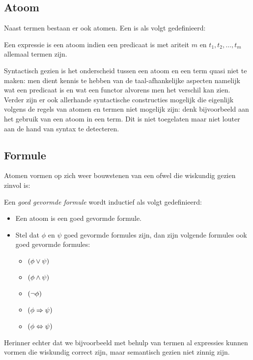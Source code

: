 \subsection{Atoom}
Naast termen bestaan er ook atomen. Een  is als volgt gedefinieerd:
\begin{definition}[Atoom]
Een expressie  is een atoom indien  een predicaat is met ariteit $m$ en $t_1,t_2,\ldots,t_m$ allemaal termen zijn.
\end{definition}
Syntactisch gezien is het onderscheid tussen een atoom en een term quasi niet te maken: men dient kennis te hebben van de taal-afhankelijke aspecten namelijk wat een predicaat is en wat een functor alvorens men het verschil kan zien. Verder zijn er ook allerhande syntactische constructies mogelijk die eigenlijk volgens de regels van atomen en termen niet mogelijk zijn: denk bijvoorbeeld aan het gebruik van een atoom in een term. Dit is niet toegelaten maar niet louter aan de hand van syntax te detecteren.
\subsection{Formule}
Atomen vormen op zich weer bouwstenen van een  ofwel  die wiskundig gezien zinvol is:
\begin{definition}
Een \emph{goed gevormde formule} wordt inductief als volgt gedefinieerd:
\begin{itemize}
 \item Een atoom is een goed gevormde formule.
 \item Stel dat $\phi$ en $\psi$ goed gevormde formules zijn, dan zijn volgende formules ook goed gevormde formules:
 \begin{multicols}{5}
  \begin{itemize}
   \item $\left( \phi\vee\psi \right)$
   \item $\left( \phi\wedge\psi \right)$
   \item $\left( \neg\phi \right)$
   \item $\left( \phi\Rightarrow\psi \right)$
   \item $\left( \phi\Leftrightarrow\psi \right)$
  \end{itemize}
 \end{multicols}
\end{itemize}
\end{definition}
Herinner echter dat we bijvoorbeeld met behulp van termen al expressies kunnen vormen die wiskundig correct zijn, maar semantisch gezien niet zinnig zijn.
